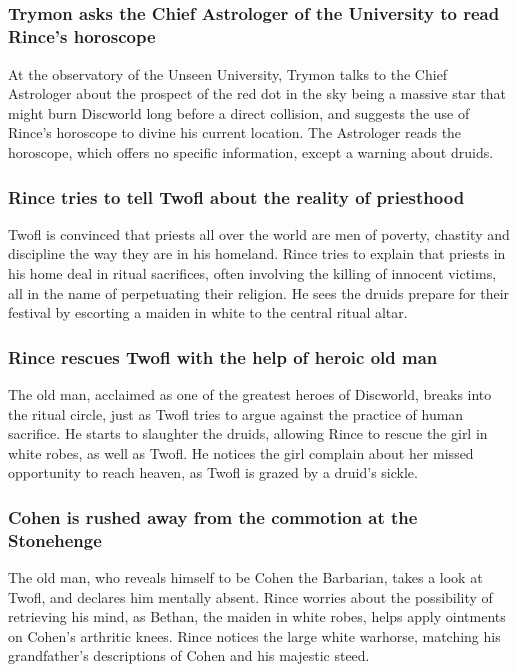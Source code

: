\subsection{}
\subsubsection{\Gls{Trymon} asks the Chief Astrologer of the University to read \Gls{Rince}'s
    horoscope}
At the observatory of the Unseen University, \Gls{Trymon} talks to the Chief Astrologer about the
prospect of the red dot in the sky being a massive star that might burn Discworld long before a
direct collision, and suggests the use of \Gls{Rince}'s horoscope to divine his current location.
The Astrologer reads the horoscope, which offers no specific information, except a warning about
druids.

\subsubsection{\Gls{Rince} tries to tell \Gls{Twofl} about the reality of priesthood}
\Gls{Twofl} is convinced that priests all over the world are men of poverty, chastity and discipline
the way they are in his homeland. \Gls{Rince} tries to explain that priests in his home deal in
ritual sacrifices, often involving the killing of innocent victims, all in the name of perpetuating
their religion. He sees the druids prepare for their festival by escorting a maiden in white to
the central ritual altar.

\subsubsection{\Gls{Rince} rescues \Gls{Twofl} with the help of heroic old man}
The old man, acclaimed as one of the greatest heroes of Discworld, breaks into the ritual circle,
just as \Gls{Twofl} tries to argue against the practice of human sacrifice. He starts to slaughter
the druids, allowing \Gls{Rince} to rescue the girl in white robes, as well as \Gls{Twofl}. He
notices the girl complain about her missed opportunity to reach heaven, as \Gls{Twofl} is grazed by
a druid's sickle.

\subsubsection{\Gls{Cohen} is rushed away from the commotion at the Stonehenge}
The old man, who reveals himself to be \Gls{Cohen} the Barbarian, takes a look at \Gls{Twofl},
and declares him mentally absent. \Gls{Rince} worries about the possibility of retrieving his mind,
as \Gls{Bethan}, the maiden in white robes, helps apply ointments on \Gls{Cohen}'s arthritic knees.
\Gls{Rince} notices the large white warhorse, matching his grandfather's descriptions of
\Gls{Cohen} and his majestic steed.

